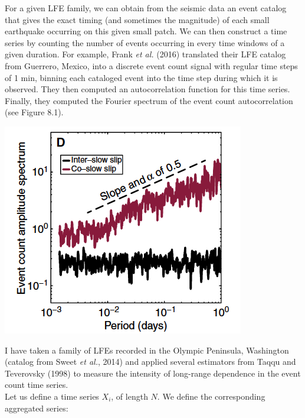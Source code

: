\documentclass[methods.tex]{subfiles}
\begin{document}
For a given LFE family, we can obtain from the seismic data an event catalog that gives the exact timing (and sometimes the magnitude) of each small earthquake occurring on this given small patch. We can then construct a time series by counting the number of events occurring in every time windows of a given duration. For example, Frank \textit{et al.} (2016) translated their LFE catalog from Guerrero, Mexico, into a discrete event count signal with regular time steps of 1 min, binning each cataloged event into the time step during which it is observed. They then computed an autocorrelation function for this time series. Finally, they computed the Fourier spectrum of the event count autocorrelation (see Figure 8.1). \\

\begin{center}
\includegraphics[width=300pt, trim={0cm 0cm 0cm 0cm},clip]{Figures/longrange/Frank_et_al_2016_Fig2D.png}
\captionsetup{type=figure}
\end{center}

I have taken a family of LFEs recorded in the Olympic Peninsula, Washington (catalog from Sweet \textit{et al.}, 2014) and applied several estimators from Taqqu and Teverovsky (1998) to measure the intensity of long-range dependence in the event count time series. \\

Let us define a time series $X_i$, of length $N$. We define the corresponding aggregated series:
\end{document}
